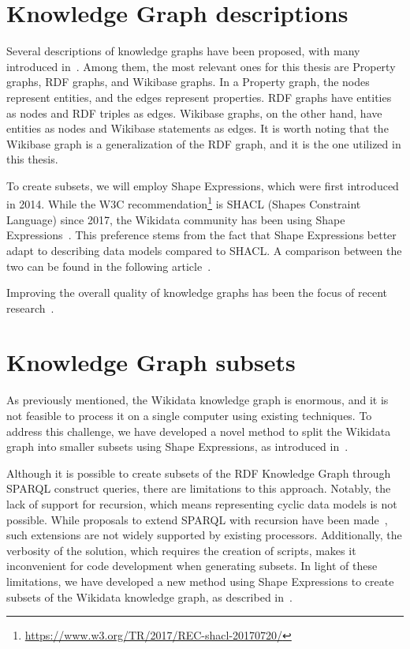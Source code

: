 \section{Knowledge Graph descriptions}

Several descriptions of knowledge graphs have been proposed, with many introduced in~\cite{https://doi.org/10.48550/arxiv.2110.11709}. Among them, the most relevant ones for this thesis are Property graphs, RDF graphs, and Wikibase graphs. In a Property graph, the nodes represent entities, and the edges represent properties. RDF graphs have entities as nodes and RDF triples as edges. Wikibase graphs, on the other hand, have entities as nodes and Wikibase statements as edges. It is worth noting that the Wikibase graph is a generalization of the RDF graph, and it is the one utilized in this thesis.

To create subsets, we will employ Shape Expressions, which were first introduced in 2014. While the W3C recommendation\footnote{\url{https://www.w3.org/TR/2017/REC-shacl-20170720/}} is SHACL (Shapes Constraint Language) since 2017, the Wikidata community has been using Shape Expressions~\cite{10.1007/978-3-030-21348-0_39}. This preference stems from the fact that Shape Expressions better adapt to describing data models compared to SHACL. A comparison between the two can be found in the following article~\cite{Labra2017}.

Improving the overall quality of knowledge graphs has been the focus of recent research~\cite{https://doi.org/10.48550/arxiv.2110.11709}.

\label{section:wd2sub}
\section{Knowledge Graph subsets}

As previously mentioned, the Wikidata knowledge graph is enormous, and it is not feasible to process it on a single computer using existing techniques. To address this challenge, we have developed a novel method to split the Wikidata graph into smaller subsets using Shape Expressions, as introduced in~\cite{https://doi.org/10.48550/arxiv.2110.11709}.

Although it is possible to create subsets of the RDF Knowledge Graph through SPARQL construct queries, there are limitations to this approach. Notably, the lack of support for recursion, which means representing cyclic data models is not possible. While proposals to extend SPARQL with recursion have been made~\cite{10.1007/978-3-319-25007-6_2}, such extensions are not widely supported by existing processors. Additionally, the verbosity of the solution, which requires the creation of scripts, makes it inconvenient for code development when generating subsets. In light of these limitations, we have developed a new method using Shape Expressions to create subsets of the Wikidata knowledge graph, as described in~\cite{https://doi.org/10.48550/arxiv.2110.11709}.


